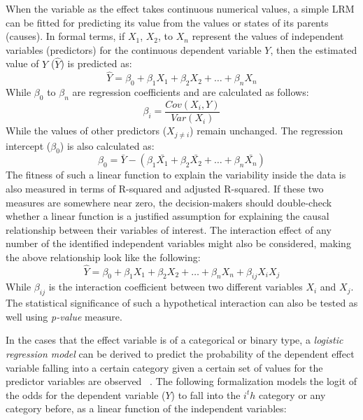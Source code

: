 \documentclass{sfuthesis}
\begin{document}
When the variable as the effect takes continuous numerical values, a simple LRM can be fitted for predicting its value from the values or states of its parents (causes). In formal terms, if $X_1$, $X_2$, to $X_n$ represent the values of independent variables (predictors) for the continuous dependent variable $Y$, then the estimated value of $Y$ ($\hat{Y}$) is predicted as:
\begin{equation}
    \hat{Y}=\beta_0 + \beta_1 X_1 + \beta_2 X_2 +\dots+ \beta_n X_n
\end{equation}
While $\beta_0$ to $\beta_n$ are regression coefficients and are calculated as follows:
\begin{equation}
    \beta_i=\frac{Cov(X_i,Y)}{Var(X_i)}
\end{equation}
While the values of other predictors ($X_{j\neq i}$) remain unchanged. The regression intercept ($\beta_0$) is also calculated as:
\begin{equation}
    \beta_0=\bar{Y} - (\beta_1 \bar{X_1} + \beta_2 \bar{X_2} +\dots+ \beta_n \bar{X_n})
\end{equation}
The fitness of such a linear function to explain the variability inside the data is also measured in terms of R-squared and adjusted R-squared. If these two measures are somewhere near zero, the decision-makers should double-check whether a linear function is a justified assumption for explaining the causal relationship between their variables of interest. The interaction effect of any number of the identified independent variables might also be considered, making the above relationship look like the following:
\begin{equation}
    \hat{Y}=\beta_0 + \beta_1 X_1 + \beta_2 X_2 +\dots+ \beta_n X_n + \beta_{ij}X_iX_j
\end{equation}
While $\beta_{ij}$ is the interaction coefficient between two different variables $X_i$ and $X_j$. The statistical significance of such a hypothetical interaction can also be tested as well using \textit{p-value} measure.\par
In the cases that the effect variable is of a categorical or binary type, a \textit{logistic regression model} can be derived to predict the probability of the dependent effect variable falling into a certain category given a certain set of values for the predictor variables are observed ~\cite{bender_ordinal_1997}. The following formalization models the logit of the odds for the dependent variable ($Y$) to fall into the $i^th$ category or any category before, as a linear function of the independent variables:
\end{document}
